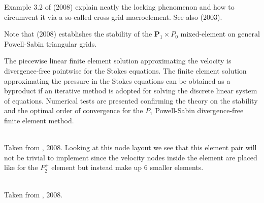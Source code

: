 Example 3.2 of \textcite{bobf08} (2008) explain neatly the locking phenomenon and how 
to circumvent it via a so-called cross-grid macroelement. See also 
\textcite{hokl03} (2003).

Note that \textcite{zhan08} (2008) establishes the stability of the ${\bm P}_1\times P_0$
mixed-element on general Powell-Sabin triangular grids.

\begin{displayquote}
{\color{darkgray}
The piecewise linear finite element solution approximating the velocity is
divergence-free pointwise for the Stokes equations. The finite element solution approximating 
the pressure in the Stokes equations can be obtained as a byproduct if an iterative
method is adopted for solving the discrete linear system of equations. Numerical tests are
presented confirming the theory on the stability and the optimal order of convergence for
the $P_1$ Powell-Sabin divergence-free finite element method.}
\end{displayquote}

\begin{center}
\\
{\captionfont Taken from \textcite{zhan08}, 2008. Looking at this node layout we see that 
this element pair will not be trivial to implement since the velocity nodes inside the element
are placed like for the $P_2^+$ element but instead make up 6 smaller elements.}
\end{center}

\begin{center}
\\
{\captionfont Taken from \textcite{zhan08}, 2008.}
\end{center}

